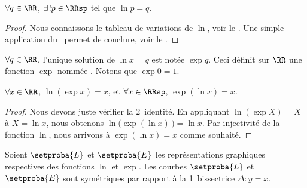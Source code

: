 \begin{fact}
	$\forall q \in \RR$,
	$\exists\kern1pt! p \in \RRsp$ tel que 
	$\ln p = q$.
\end{fact}


\begin{proof}
	Nous connaissons le tableau de variations de $\ln$, voir le .
	Une simple application du \tvi\ permet de conclure, voir le .
\end{proof}




\begin{defi}
	$\forall q \in \RR$, 
	l'unique solution de $\ln x = q$ est notée $\exp q$.
	Ceci définit sur $\RR$ une fonction $\exp$ nommée .
	Notons que $\exp 0 = 1$.
\end{defi}




\begin{fact}
	$\forall x \in \RR$, $\ln ( \exp x ) = x$,
	et
	$\forall x \in \RRsp$, $\exp ( \ln x ) = x$.
\end{fact}


\begin{proof}	
	Nous devons juste vérifier la 2\ieme\ identité.
	En appliquant $\ln ( \exp X ) = X$ à $X = \ln x$,
	nous obtenons $\ln \big( \exp ( \ln x ) \,\big) = \ln x$.
	Par injectivité de la fonction $\ln$, nous arrivons à $\exp ( \ln x ) = x$ comme souhaité.
\end{proof}




\begin{fact} \label{exp-sym-ln}
	Soient $\setproba{L}$ et $\setproba{E}$ les représentations graphiques respectives des fonctions $\ln$ et $\exp$.
	Les courbes $\setproba{L}$ et $\setproba{E}$ sont symétriques par rapport à la 1\iere\ bissectrice $\Delta: y = x$.
\end{fact}


